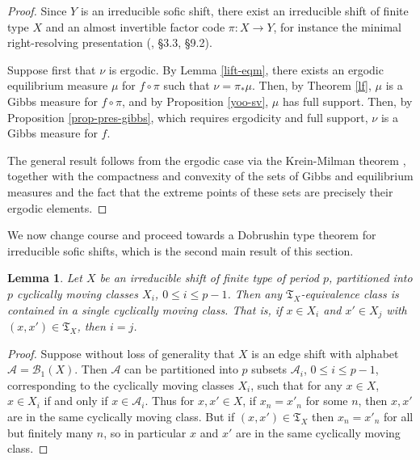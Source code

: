 \documentclass{amsproc}
\numberwithin{theorem}{section}
\newtheorem{lemma}[theorem]{Lemma}
\theoremstyle{remark}
\theoremstyle{definition}
\newcommand{\cA}{\mathcal{A}}
\newcommand{\cB}{\mathcal{B}}
\newcommand{\fT}{\mathfrak{T}}
\theoremstyle{plain}
\begin{document}
\begin{proof}
Since $Y$ is an irreducible sofic shift, there exist an irreducible shift of finite type $X$ and an almost invertible factor code $\pi\colon X \to Y$, for instance the minimal right-resolving presentation (\cite{lind1995introduction}, \S 3.3, \S 9.2). 

Suppose first that $\nu$ is ergodic. By Lemma \ref{lift-eqm}, there exists an ergodic equilibrium measure $\mu$ for $f \circ \pi$ such that $\nu = \pi_{*}\mu$.  Then, by Theorem \ref{lf}, $\mu$ is a Gibbs measure for $f \circ \pi$, and by Proposition \ref{yoo-sv}, $\mu$ has full support.  Then, by Proposition \ref{prop-pres-gibbs}, which requires ergodicity and full support, $\nu$ is a Gibbs measure for $f$.

The general result follows from the ergodic case via the Krein-Milman theorem \cite{simon2011convexity}, together with the compactness and convexity of the sets of Gibbs and equilibrium measures \cite{keller1998equilibrium} and the fact that the extreme points of these sets are precisely their ergodic elements.
\end{proof}

We now change course and proceed towards a Dobrushin type theorem for irreducible sofic shifts, which is the second main result of this section.

\begin{lemma}\label{lemma-period-trans}
Let $X$ be an irreducible shift of finite type of period $p$, partitioned into $p$ cyclically moving classes $X_i$, $0 \leq i \leq p -1$. Then any $\fT_X$-equivalence class is contained in a single cyclically moving class. That is, if $x \in X_i$ and $x' \in X_j$ with $(x,x') \in \fT_X$, then $i=j$.
\end{lemma}

\begin{proof}
Suppose without loss of generality that $X$ is an edge shift with alphabet $\cA = \cB_1(X)$. Then $\cA$ can be partitioned into $p$ subsets  $\cA_i$, $0 \leq i \leq p-1$, corresponding to the cyclically moving classes $X_i$, such that for any $x \in X$, $x \in X_i$ if and only if $x \in \cA_i$. Thus for $x,x' \in X$, if $x_n = x'_n$ for some $n$, then $x,x'$ are in the same cyclically moving class. But if $(x,x') \in \fT_X$ then $x_n = x'_n$ for all but finitely many $n$, so in particular $x$ and $x'$ are in the same cyclically moving class.
\end{proof}
\end{document}
